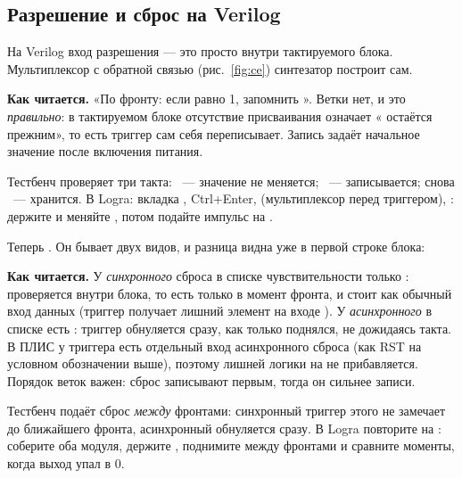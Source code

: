 \subsection{Разрешение и сброс на Verilog}
\label{sec:ff-en-rst-v}

На Verilog вход разрешения --- это просто  внутри тактируемого
блока. Мультиплексор с обратной связью (рис.~\ref{fig:ce}) синтезатор
построит сам.


\textbf{Как читается.} «По фронту: если  равно 1, запомнить ».
Ветки  нет, и это \emph{правильно}: в тактируемом блоке отсутствие
присваивания означает « остаётся прежним», то есть триггер сам себя
переписывает. Запись  задаёт начальное значение после
включения питания.

Тестбенч  проверяет три такта: ~--- значение
не меняется; ~--- записывается; снова ~--- хранится.
В Logra: вкладка , Ctrl+Enter,  (мультиплексор перед
триггером), : держите  и меняйте , потом
подайте импульс на .

Теперь . Он бывает двух видов, и разница видна уже в
первой строке блока:



\textbf{Как читается.} У \emph{синхронного} сброса в списке чувствительности
только :  проверяется внутри блока, то есть
только в момент фронта, и стоит как обычный вход данных (триггер получает
лишний элемент на входе ). У \emph{асинхронного} в списке есть
: триггер обнуляется сразу, как только 
поднялся, не дожидаясь такта. В ПЛИС у триггера есть отдельный вход
асинхронного сброса (как RST на условном обозначении выше), поэтому
лишней логики на  не прибавляется. Порядок веток  важен: сброс записывают первым, тогда он сильнее записи.


Тестбенч подаёт сброс \emph{между} фронтами: синхронный триггер этого не
замечает до ближайшего фронта, асинхронный обнуляется сразу. В Logra
повторите на : соберите оба модуля, держите ,
поднимите  между фронтами и сравните моменты, когда выход упал в 0.

